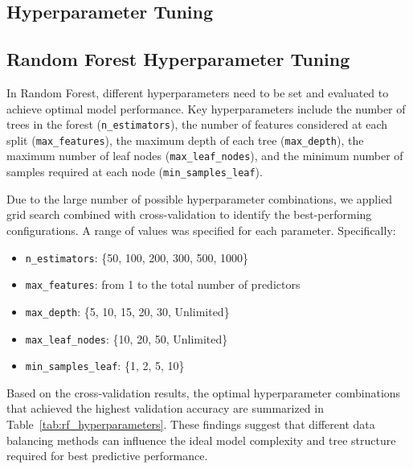 \subsection{Hyperparameter Tuning}

\subsection{Random Forest Hyperparameter Tuning}

In Random Forest, different hyperparameters need to be set and evaluated to achieve optimal model performance. Key hyperparameters include the number of trees in the forest (\texttt{n\_estimators}), the number of features considered at each split (\texttt{max\_features}), the maximum depth of each tree (\texttt{max\_depth}), the maximum number of leaf nodes (\texttt{max\_leaf\_nodes}), and the minimum number of samples required at each node (\texttt{min\_samples\_leaf}).

Due to the large number of possible hyperparameter combinations, we applied grid search combined with cross-validation to identify the best-performing configurations. 
A range of values was specified for each parameter. Specifically:

\begin{itemize}
    \item \texttt{n\_estimators}: \{50, 100, 200, 300, 500, 1000\}
    \item \texttt{max\_features}: from 1 to the total number of predictors
    \item \texttt{max\_depth}: \{5, 10, 15, 20, 30, Unlimited\}
    \item \texttt{max\_leaf\_nodes}: \{10, 20, 50, Unlimited\}
    \item \texttt{min\_samples\_leaf}: \{1, 2, 5, 10\}
\end{itemize}

Based on the cross-validation results, the optimal hyperparameter combinations that achieved the 
highest validation accuracy are summarized in Table~\ref{tab:rf_hyperparameters}.
 These findings suggest that different data balancing methods can influence the ideal model complexity and tree structure required for best predictive performance.

    
\begin{table}[!h]
    \centering
    \caption{Optimal hyperparameters for Random Forest across different datasets.}
    \label{tab:rf_hyperparameters}
\end{table}

